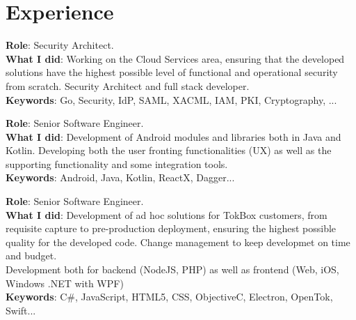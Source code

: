 \documentclass[]{resume}
\begin{document}
\lastupdated


\begin{minipage}[t]{0.66\textwidth}

\section{Experience}
\textbf{Role}: Security Architect.\\
\textbf{What I did}: Working on the Cloud Services area, ensuring that the developed solutions have the highest possible level of functional and operational security from scratch. Security Architect and full stack developer. \\
\textbf{Keywords}: Go, Security, IdP, SAML, XACML, IAM, PKI, Cryptography, ...
\sectionsep

\textbf{Role}: Senior Software Engineer.\\
\textbf{What I did}: Development of Android modules and libraries both in Java and Kotlin. Developing both the user fronting functionalities (UX) as well as the supporting functionality and some integration tools.\\
\textbf{Keywords}: Android, Java, Kotlin, ReactX, Dagger...
\sectionsep

\textbf{Role}: Senior Software Engineer.\\
\textbf{What I did}: Development of ad hoc solutions for TokBox customers, from requisite capture to pre-production deployment, ensuring the highest possible quality for the developed code. Change management to keep developmet on time and budget.\\
Development both for backend (NodeJS, PHP) as well as frontend (Web, iOS, Windows .NET with WPF)\\
\textbf{Keywords}: C\#, JavaScript, HTML5, CSS, ObjectiveC, Electron, OpenTok, Swift...
\sectionsep


\end{minipage}
\end{document}
